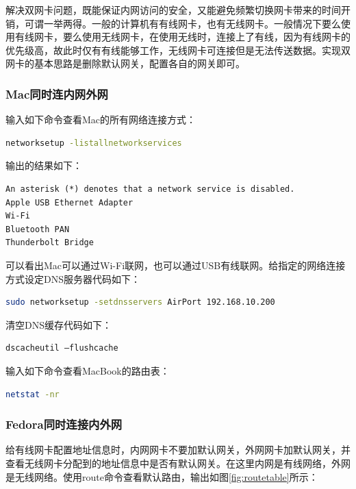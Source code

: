 \documentclass[letter]{book}
\begin{document}
解决双网卡问题，既能保证内网访问的安全，又能避免频繁切换网卡带来的时间开销，可谓一举两得。一般的计算机有有线网卡，也有无线网卡。一般情况下要么使用有线网卡，要么使用无线网卡，在使用无线时，连接上了有线，因为有线网卡的优先级高，故此时仅有有线能够工作，无线网卡可连接但是无法传送数据。实现双网卡的基本思路是删除默认网关，配置各自的网关即可。

\subsubsection{Mac同时连内网外网}

输入如下命令查看Mac的所有网络连接方式：

\begin{lstlisting}[language=Bash]
networksetup -listallnetworkservices
\end{lstlisting}

输出的结果如下：

\begin{lstlisting}
An asterisk (*) denotes that a network service is disabled.
Apple USB Ethernet Adapter
Wi-Fi
Bluetooth PAN
Thunderbolt Bridge
\end{lstlisting}

可以看出Mac可以通过Wi-Fi联网，也可以通过USB有线联网。给指定的网络连接方式设定DNS服务器代码如下：

\begin{lstlisting}[language=Bash]
sudo networksetup -setdnsservers AirPort 192.168.10.200
\end{lstlisting}

清空DNS缓存代码如下：

\begin{lstlisting}[language=Bash]
dscacheutil –flushcache
\end{lstlisting}

输入如下命令查看MacBook的路由表：

\begin{lstlisting}[language=Bash]
netstat -nr
\end{lstlisting}

\subsubsection{Fedora同时连接内外网}

给有线网卡配置地址信息时，内网网卡不要加默认网关，外网网卡加默认网关，并查看无线网卡分配到的地址信息中是否有默认网关。在这里内网是有线网络，外网是无线网络。使用route命令查看默认路由，输出如图\ref{fig:routetable}所示：
\end{document}
